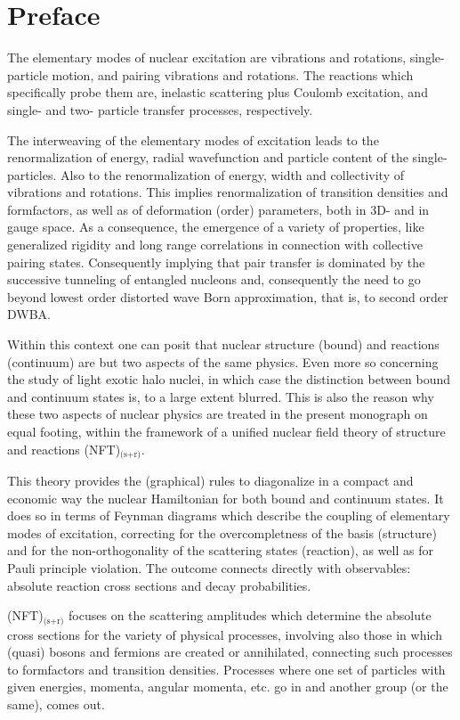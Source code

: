 \chapter*{Preface}\label{preface}
The elementary modes of nuclear excitation are vibrations and rotations, single-particle  motion, and pairing vibrations and rotations. The reactions which specifically probe  them  are, inelastic scattering plus Coulomb excitation, and single- and two- particle transfer processes, respectively. 

The interweaving of the elementary modes of excitation leads to the renormalization of  energy, radial wavefunction and particle content of the single-particles. Also to the renormalization of energy, width and collectivity of vibrations and rotations. This implies renormalization of transition densities and formfactors, as well as of deformation (order) parameters, both in 3D- and in gauge space. As a consequence, the emergence of a variety of properties, like generalized rigidity and long range correlations in connection with collective pairing states. Consequently implying that pair transfer is dominated by the successive tunneling of entangled nucleons and, consequently the need to go beyond lowest order distorted wave Born approximation, that is, to second order DWBA.    

Within this context one can posit that nuclear structure (bound) and reactions (continuum) are but two aspects of the same physics.  Even more so concerning the study of light exotic halo nuclei, in which case the distinction between bound and continuum states is, to a large extent blurred. This is also the reason why these two aspects of nuclear physics are treated in the present monograph on equal footing,  within the framework of a unified nuclear field theory of structure and reactions (NFT)$_\text{(s+r)}$. 


This theory provides the (graphical) rules to diagonalize in a compact and economic way the nuclear Hamiltonian for both bound and continuum states. It does so in terms of Feynman diagrams which describe the coupling of elementary modes of excitation, correcting for the overcompletness of the basis  (structure) and for the  non-orthogonality of the scattering states (reaction), as well as for Pauli principle violation. The outcome connects directly with observables: absolute reaction cross sections and decay probabilities. 


(NFT)$_\text{(s+r)}$ focuses on the scattering amplitudes which determine the absolute cross sections for the variety of physical processes, involving also those in which (quasi) bosons and fermions are created or annihilated, connecting such processes to formfactors and transition densities. Processes where one set of particles with given energies, momenta, angular momenta, etc. go in and another group (or the same), comes out. 

